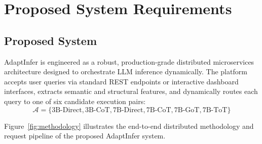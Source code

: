 \documentclass[12pt,a4paper]{report}
\begin{document}
\chapter{Proposed System Requirements}
\label{ch:proposed_system}

\section{Proposed System}
\label{sec:proposed_system_desc}
AdaptInfer is engineered as a robust, production-grade distributed microservices architecture designed to orchestrate LLM inference dynamically. The platform accepts user queries via standard REST endpoints or interactive dashboard interfaces, extracts semantic and structural features, and dynamically routes each query to one of six candidate execution pairs:
\begin{equation}
\mathcal{A} = \{\text{3B-Direct}, \text{3B-CoT}, \text{7B-Direct}, \text{7B-CoT}, \text{7B-GoT}, \text{7B-ToT}\}
\end{equation}

Figure~\ref{fig:methodology} illustrates the end-to-end distributed methodology and request pipeline of the proposed AdaptInfer system.
\end{document}

